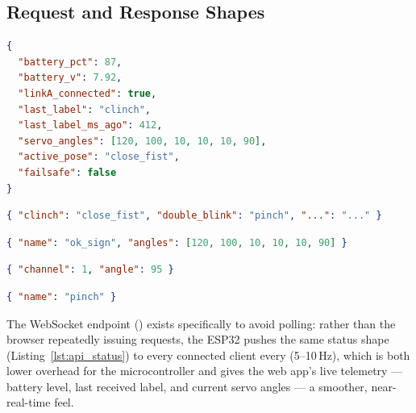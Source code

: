 \subsection{Request and Response Shapes}

\begin{lstlisting}[language=json,
    caption={\code{GET /api/status} response --- also the shape
    pushed periodically over the \code{/ws} WebSocket.},
    label={lst:api_status}]
{
  "battery_pct": 87,
  "battery_v": 7.92,
  "linkA_connected": true,
  "last_label": "clinch",
  "last_label_ms_ago": 412,
  "servo_angles": [120, 100, 10, 10, 10, 90],
  "active_pose": "close_fist",
  "failsafe": false
}
\end{lstlisting}

\begin{lstlisting}[language=json,
    caption={\code{POST /api/mappings} request body --- the server
    replaces the stored map wholesale and persists it.},
    label={lst:api_mappings}]
{ "clinch": "close_fist", "double_blink": "pinch", "...": "..." }
\end{lstlisting}

\begin{lstlisting}[language=json,
    caption={\code{POST /api/poses} request body.},
    label={lst:api_poses}]
{ "name": "ok_sign", "angles": [120, 100, 10, 10, 10, 90] }
\end{lstlisting}

\begin{lstlisting}[language=json,
    caption={\code{POST /api/servo} request body --- used by the
    pose editor's sliders to preview one joint at a time on the
    real hand.},
    label={lst:api_servo}]
{ "channel": 1, "angle": 95 }
\end{lstlisting}

\begin{lstlisting}[language=json,
    caption={\code{POST /api/pose/apply} request body.},
    label={lst:api_apply}]
{ "name": "pinch" }
\end{lstlisting}

The WebSocket endpoint () exists specifically to avoid
polling: rather than the browser repeatedly issuing
 requests, the ESP32 pushes the same status
shape (Listing~\ref{lst:api_status}) to every connected client every
 (5--10\,Hz), which is both lower
overhead for the microcontroller and gives the web app's live
telemetry --- battery level, last received label, and current servo
angles --- a smoother, near-real-time feel.


